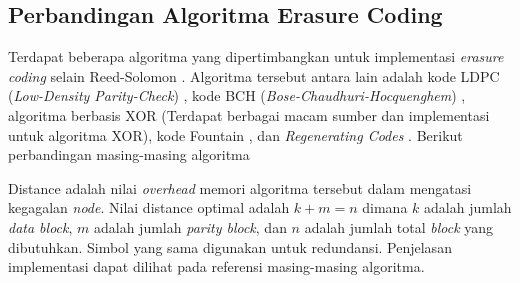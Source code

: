 \subsection{Perbandingan Algoritma Erasure Coding}
Terdapat beberapa algoritma yang dipertimbangkan untuk implementasi \textit{erasure coding} selain Reed-Solomon \parencite{manasse2009reed}. Algoritma tersebut antara lain adalah kode LDPC (\textit{Low-Density Parity-Check}) \parencite{gallagher1962ldpc}, kode BCH (\textit{Bose-Chaudhuri-Hocquenghem}) \parencite{bose1960bch}, algoritma berbasis XOR (Terdapat berbagai macam sumber dan implementasi untuk algoritma XOR), kode Fountain \parencite{asteris2014fountain}, dan \textit{Regenerating Codes} \parencite{rashmi2012regenerating}. Berikut perbandingan masing-masing algoritma 

\begin{table}[ht]
    \centering
    \caption{Perbandingan algoritma erasure coding}
    \label{tab:ec-algorithm}
\end{table}

Distance adalah nilai \textit{overhead} memori algoritma tersebut dalam mengatasi kegagalan \textit{node}. Nilai distance optimal adalah $k + m = n$ dimana $k$ adalah jumlah \textit{data block}, $m$ adalah jumlah \textit{parity block}, dan $n$ adalah jumlah total \textit{block} yang dibutuhkan. Simbol yang sama digunakan untuk redundansi. Penjelasan implementasi dapat dilihat pada referensi masing-masing algoritma.
